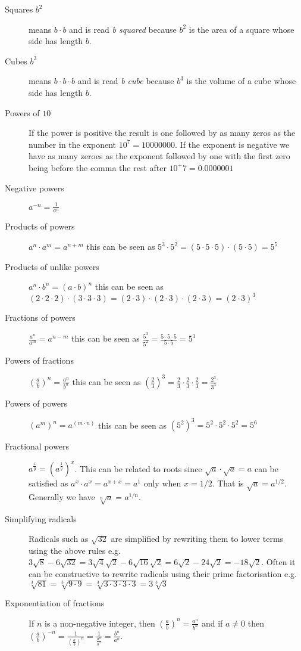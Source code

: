 \begin{description}
\item [Squares $b^2$] means $b \cdot b$ and is read \emph{b squared} because $b^2$ is the area of a square whose side has length $b$.
\item [Cubes $b^3$] means $b \cdot b \cdot b$ and is read \emph{b cube} because $b^3$ is the volume of a cube whose side has length $b$.
\item [Powers of $10$] If the power is positive the result is one followed by as many zeros as the number in the exponent $10^7 = 10000000$. If the exponent is negative we have as many zeroes as the exponent followed by one with the first zero being before the comma the rest after $10^+7 = 0.0000001$
\item [Negative powers] $a^{-n} = \frac{1}{a^n}$
\item [Products of powers] $a^n \cdot a^m = a^{n+m}$ this can be seen as $5^3 \cdot 5^2 = (5 \cdot 5 \cdot 5) \cdot (5 \cdot 5)= 5^5$
\item [Products of unlike powers] $a^n \cdot b^n = (a \cdot b)^n$ this can be seen as $(2 \cdot 2 \cdot 2) \cdot (3 \cdot 3 \cdot 3) = (2 \cdot 3) \cdot (2 \cdot 3) \cdot (2 \cdot 3) = (2 \cdot 3)^3$
\item [Fractions of powers] $\frac{a^n}{a^m} = a^{n-m}$ this can be seen as $\frac{5^3}{5^2} = \frac{5 \cdot 5 \cdot 5}{5 \cdot 5} = 5^1$
\item [Powers of fractions] $\left(\frac{a}{b}\right)^n = \frac{a^n}{b^n}$ this can be seen as $\left(\frac{2}{3}\right)^3 = \frac{2}{3} \cdot \frac{2}{3} \cdot \frac{2}{3} = \frac{2^3}{3^3}$
\item [Powers of powers] $(a^m)^n = a^{(m \cdot n)}$ this can be seen as $(5^2)^3 = 5^2 \cdot 5^2 \cdot 5^2 = 5^{6}$
\item [Fractional powers] $a^{\frac{x}{y}} = (a^{\frac{1}{y}})^x$. This can be related to roots since $\sqrt{a} \cdot \sqrt{a} = a$ can be satisfied as $a^{x} \cdot a^{x} = a^{x+x} = a^{1}$ only when $x = 1/2$. That is $\sqrt{a} = a^{1/2}$. Generally we have $\sqrt[n]{a} = a^{1/n}$.
\item [Simplifying radicals] Radicals such as $\sqrt{32}$ are simplified by rewriting them to lower terms using the above rules e.g. $3\sqrt{8} - 6\sqrt{32} = 3\sqrt{4}\sqrt{2} - 6\sqrt{16}\sqrt{2} = 6\sqrt{2} - 24\sqrt{2} = -18\sqrt{2}$. Often it can be constructive to rewrite radicals using their prime factorisation e.g. $\sqrt[3]{81} = \sqrt[3]{9 \cdot 9} = \sqrt[3]{3 \cdot 3 \cdot 3 \cdot 3} = 3\sqrt[3]{3}$
\item [Exponentiation of fractions] If $n$ is a non-negative integer, then
$\left(\frac{a}{b}\right)^{n} = \frac{a^n}{b^n}$ and if $a \neq 0$ then
$\left(\frac{a}{b}\right)^{-n} = \frac{1}{\left(\frac{a}{b}\right)^n} =
\frac{1}{\frac{a^n}{b^n}} =\frac{b^n}{a^n}$.
\end{description}

